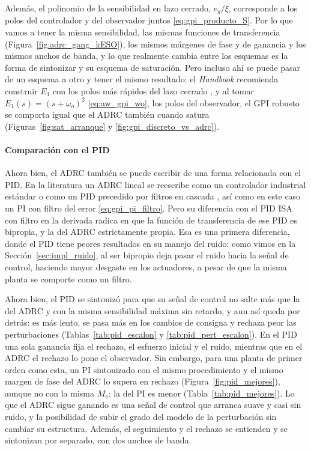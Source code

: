 Además, el polinomio de la sensibilidad en lazo cerrado, $e_y/\xi$, corresponde a los polos del
controlador y del observador juntos \eqref{eq:gpi_producto_S}. Por lo que vamos a tener la misma
sensibilidad, las mismas funciones de transferencia (Figura~\ref{fig:adrc_gang_kESO}), los mismos
márgenes de fase y de ganancia y los mismos anchos de banda, y lo que realmente cambia entre los
esquemas es la forma de sintonizar y su esquema de saturación. Pero incluso ahí se puede pasar de un
esquema a otro y tener el mismo resultado: el \emph{Handbook} recomienda construir $E_1$ con los polos
más rápidos del lazo cerrado \cite[ec.~19.3]{levine2011handbook}, y al tomar
$E_1(s) = (s + \omega_o)^2$ \eqref{eq:aw_gpi_wo}, los polos del observador, el GPI robusto se comporta igual que
el ADRC también cuando satura (Figuras~\ref{fig:sat_arranque} y \ref{fig:gpi_discreto_vs_adrc}).

\paragraph{Comparación con el PID}
\label{sec:por_que}

Ahora bien, el ADRC también se puede escribir de una forma relacionada con el PID. En la literatura un
ADRC lineal se reescribe como un controlador industrial estándar \cite{stankovic2024pid} o como un PID
precedido por filtros en cascada \cite{cao2025cascaded}, así como en este caso un PI con filtro del
error \eqref{eq:gpi_pi_filtro}. Pero su diferencia con el PID ISA con filtro en la derivada radica en
que la función de transferencia de ese PID es bipropia, y la del ADRC estrictamente propia. Esa es una
primera diferencia, donde el PID tiene peores resultados en su manejo del ruido: como vimos en la
Sección~\ref{sec:impl_ruido}, al ser bipropio deja pasar el ruido hacia la señal de control, haciendo mayor
desgaste en los actuadores, a pesar de que la misma planta se comporte como un filtro.

Ahora bien, el PID se sintonizó para que su señal de control no salte más que la del ADRC y con la
misma sensibilidad máxima sin retardo, y aun así queda por detrás: es más lento, se pasa más en los
cambios de consigna y rechaza peor las perturbaciones (Tablas~\ref{tab:pid_escalon}
y \ref{tab:pid_pert_escalon}). En el PID una sola ganancia fija el rechazo, el esfuerzo inicial y el
ruido, mientras que en el ADRC el rechazo lo pone el observador. Sin embargo, para una planta de primer
orden como esta, un PI sintonizado con el mismo procedimiento y el mismo margen de fase del ADRC lo
supera en rechazo (Figura~\ref{fig:pid_mejores}), aunque no con la misma $M_s$: la del PI es menor
(Tabla~\ref{tab:pid_mejores}). Lo que el ADRC sigue ganando es una señal de control que arranca suave y casi
sin ruido, y la posibilidad de subir el grado del modelo de la perturbación sin cambiar su estructura.
Además, el seguimiento y el rechazo se entienden y se sintonizan por separado, con dos anchos de banda.


